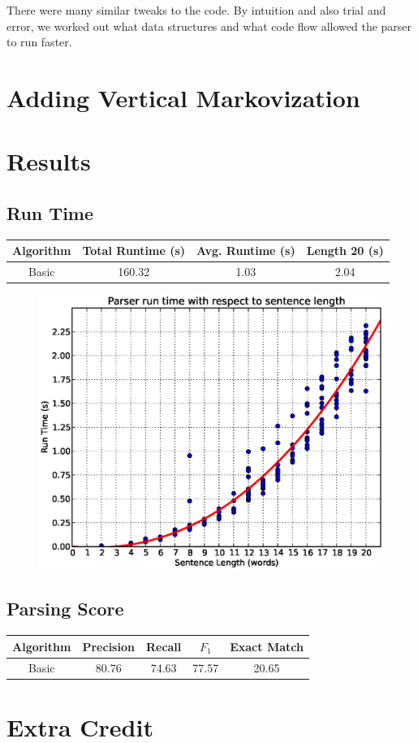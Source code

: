 \documentclass[12pt]{article}
\begin{document}
There were many similar tweaks to the code. By intuition and also trial and error, we worked out what data structures and what code flow allowed the parser to run faster.
\section{Adding Vertical Markovization}

\section{Results}
\subsection{Run Time}
\begin{center}
\begin{tabular}{|c|c|c|c|}
\hline
Algorithm & Total Runtime (s) & Avg. Runtime (s) & Length 20 (s)\\\hline
Basic & 160.32 & 1.03 & 2.04 \\\hline

\end{tabular}
\end{center}
\begin{figure}[H]
\centering
\includegraphics[width=0.5\linewidth]{./stats/runtime}
\end{figure}
\subsection{Parsing Score}
\begin{center}
\begin{tabular}{|c|c|c|c|c|}
\hline
Algorithm & Precision & Recall & $F_1$ & Exact Match \\\hline
Basic & 80.76 & 74.63 & 77.57 & 20.65\\\hline

\end{tabular}
\end{center}
\section{Extra Credit}
\end{document}
